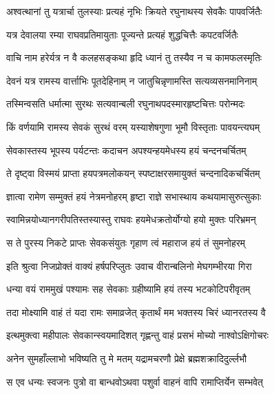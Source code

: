 \twolineshloka
{अश्वत्थानां तु यत्रार्चा तुलस्याः प्रत्यहं नृभिः}
{क्रियते रघुनाथस्य सेवकैः पापवर्जितैः}%

\twolineshloka
{यत्र देवालया रम्या राघवप्रतिमायुताः}
{पूज्यन्ते प्रत्यहं शुद्धचित्तैः कपटवर्जितैः}%

\twolineshloka
{वाचि नाम हरेर्यत्र न वै कलहसङ्कथा}
{हृदि ध्यानं तु तस्यैव न च कामफलस्मृतिः}%

\twolineshloka
{देवनं यत्र रामस्य वार्त्ताभिः पूतदेहिनाम्}
{न जातुचिन्नृणामस्ति सत्यव्यसनमानिनाम्}%

\twolineshloka
{तस्मिन्वसति धर्मात्मा सुरथः सत्यवान्बली}
{रघुनाथपदस्मारहृष्टचित्तः परोन्मदः}%

\twolineshloka
{किं वर्णयामि रामस्य सेवकं सुरथं वरम्}
{यस्याशेषगुणा भूमौ विस्तृताः पावयन्त्यघम्}%

\twolineshloka
{सेवकास्तस्य भूपस्य पर्यटन्तः कदाचन}
{अपश्यन्हयमेधस्य हयं चन्दनचर्चितम्}%

\twolineshloka
{ते दृष्ट्वा विस्मयं प्राप्ता हयपत्रमलोकयन्}
{स्पष्टाक्षरसमायुक्तं चन्दनादिकचर्चितम्}%

\twolineshloka
{ज्ञात्वा रामेण सम्मुक्तं हयं नेत्रमनोहरम्}
{हृष्टा राज्ञे सभास्थाय कथयामासुरुत्सुकाः}%

\twolineshloka
{स्वामिन्नयोध्यानगरीपतिस्तस्यास्तु राघवः}
{हयमेधक्रतोर्योग्यो हयो मुक्तः परिभ्रमन्}%

\twolineshloka
{स ते पुरस्य निकटे प्राप्तः सेवकसंयुतः}
{गृहाण त्वं महाराज हयं तं सुमनोहरम्}%


\twolineshloka
{इति श्रुत्वा निजप्रोक्तं वाक्यं हर्षपरिप्लुतः}
{उवाच वीरान्बलिनो मेघगम्भीरया गिरा}%


\twolineshloka
{धन्या वयं राममुखं पश्यामः सह सेवकाः}
{ग्रहीष्यामि हयं तस्य भटकोटिपरीवृतम्}%

\twolineshloka
{तदा मोक्ष्यामि वाहं तं यदा रामः समाव्रजेत्}
{कृतार्थं मम भक्तस्य चिरं ध्यानरतस्य वै}%


\twolineshloka
{इत्थमुक्त्वा महीपालः सेवकान्स्वयमादिशत्}
{गृह्णन्तु वाहं प्रसभं मोच्यो नाश्वोऽक्षिगोचरः}%

\twolineshloka
{अनेन सुमहाँल्लाभो भविष्यति तु मे मतम्}
{यद्रामचरणौ प्रेक्षे ब्रह्मशक्रादिदुर्ल्लभौ}%

\twolineshloka
{स एव धन्यः स्वजनः पुत्रो वा बान्धवोऽथवा}
{पशुर्वा वाहनं वापि रामाप्तिर्येन सम्भवेत्}%

